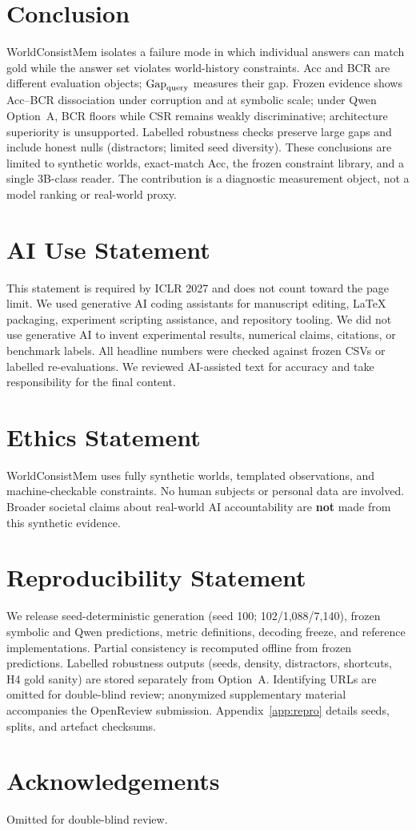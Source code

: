 \section{Conclusion}
\label{sec:conclusion}

WorldConsistMem isolates a failure mode in which individual answers can match gold while the answer set violates world-history constraints. Acc and BCR are different evaluation objects; $\mathrm{Gap}_{\mathrm{query}}$ measures their gap. Frozen evidence shows Acc--BCR dissociation under corruption and at symbolic scale; under Qwen Option~A, BCR floors while CSR remains weakly discriminative; architecture superiority is unsupported. Labelled robustness checks preserve large gaps and include honest nulls (distractors; limited seed diversity). These conclusions are limited to synthetic worlds, exact-match Acc, the frozen constraint library, and a single 3B-class reader. The contribution is a diagnostic measurement object, not a model ranking or real-world proxy.

\section*{AI Use Statement}
This statement is required by ICLR 2027 and does not count toward the page limit.
We used generative AI coding assistants for manuscript editing, LaTeX packaging, experiment scripting assistance, and repository tooling. We did not use generative AI to invent experimental results, numerical claims, citations, or benchmark labels. All headline numbers were checked against frozen CSVs or labelled re-evaluations. We reviewed AI-assisted text for accuracy and take responsibility for the final content.

\section*{Ethics Statement}
WorldConsistMem uses fully synthetic worlds, templated observations, and machine-checkable constraints. No human subjects or personal data are involved. Broader societal claims about real-world AI accountability are \textbf{not} made from this synthetic evidence.

\section*{Reproducibility Statement}
\label{sec:repro-statement}
We release seed-deterministic generation (seed 100; 102/1{,}088/7{,}140), frozen symbolic and Qwen predictions, metric definitions, decoding freeze, and reference implementations. Partial consistency is recomputed offline from frozen predictions. Labelled robustness outputs (seeds, density, distractors, shortcuts, H4 gold sanity) are stored separately from Option~A. Identifying URLs are omitted for double-blind review; anonymized supplementary material accompanies the OpenReview submission. Appendix~\ref{app:repro} details seeds, splits, and artefact checksums.

\section*{Acknowledgements}
Omitted for double-blind review.
